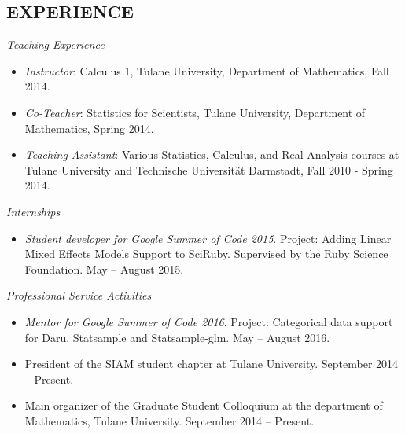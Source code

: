 \documentclass[margin]{res} %
\begin{document}
\begin{resume}
 
 
 
\section{EXPERIENCE}

{\sl Teaching Experience}
\begin{itemize} \itemsep -2pt %
\item \emph{Instructor}: Calculus 1, Tulane University, Department of Mathematics, Fall 2014.
\item \emph{Co-Teacher}: Statistics for Scientists, Tulane University, Department of Mathematics, Spring 2014.
\item \emph{Teaching Assistant}: Various Statistics, Calculus, and Real Analysis courses at Tulane University and Technische Universit\"{a}t Darmstadt, Fall 2010 - Spring 2014.
\end{itemize}

{\sl Internships} 
\begin{itemize}
\item {\it Student developer for Google Summer of Code 2015}. Project: Adding Linear Mixed Effects Models Support to SciRuby. Supervised by the Ruby Science Foundation. May -- August 2015.
\end{itemize} 

{\sl Professional Service Activities}
\begin{itemize}
\item {\it Mentor for Google Summer of Code 2016}. Project: Categorical data support for Daru, Statsample and Statsample-glm. May -- August 2016.
\item President of the SIAM student chapter at Tulane University. September 2014 -- Present.
\item Main organizer of the Graduate Student Colloquium at the department of Mathematics, Tulane University. September 2014 -- Present.
\end{itemize}


\end{resume}
\end{document}
